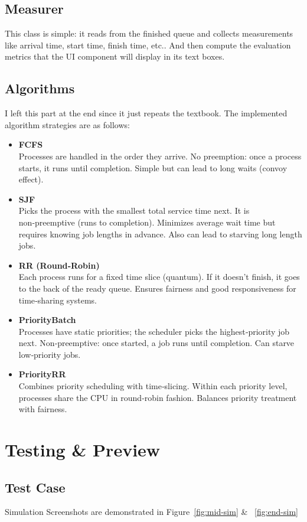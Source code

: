 \documentclass[conference]{IEEEtran}
\begin{document}
\subsection{Measurer}
This class is simple: it reads from the finished queue and collects measurements like arrival time, start time, finish time, etc.. And then compute the evaluation metrics that the UI component will display in its text boxes.
\subsection{Algorithms}
I left this part at the end since it just repeats the textbook. The implemented algorithm strategies are as follows:
\begin{itemize}
  \item \textbf{FCFS}\\
    Processes are handled in the order they arrive. No preemption: once a process starts, it runs until completion. Simple but can lead to long waits (convoy effect).
  \item \textbf{SJF}\\
    Picks the process with the smallest total service time next. It is non‑preemptive (runs to completion). Minimizes average wait time but requires knowing job lengths in advance. Also can lead to starving long length jobs.
  \item \textbf{RR (Round‑Robin)}\\
    Each process runs for a fixed time slice (quantum). If it doesn’t finish, it goes to the back of the ready queue. Ensures fairness and good responsiveness for time‑sharing systems.
  \item \textbf{PriorityBatch}\\
    Processes have static priorities; the scheduler picks the highest‑priority job next. Non‑preemptive: once started, a job runs until completion. Can starve low‑priority jobs.
  \item \textbf{PriorityRR}\\
    Combines priority scheduling with time‑slicing. Within each priority level, processes share the CPU in round‑robin fashion. Balances priority treatment with fairness.
\end{itemize}

\section{Testing \& Preview}

\subsection{Test Case}
Simulation Screenshots are demonstrated in Figure~\ref{fig:mid-sim} \& ~\ref{fig:end-sim}
\end{document}
